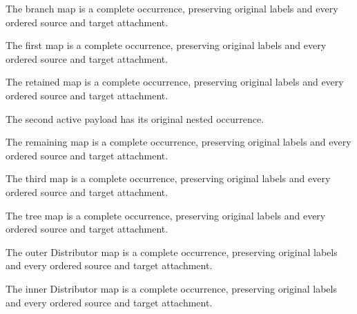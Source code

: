 The branch map is a complete occurrence, preserving original labels and every ordered source and target attachment.
\par{}

The first map is a complete occurrence, preserving original labels and every ordered source and target attachment.
\par{}

The retained map is a complete occurrence, preserving original labels and every ordered source and target attachment.
\par{}

The second active payload has its original nested occurrence.
\par{}

The remaining map is a complete occurrence, preserving original labels and every ordered source and target attachment.
\par{}

The third map is a complete occurrence, preserving original labels and every ordered source and target attachment.
\par{}

The tree map is a complete occurrence, preserving original labels and every ordered source and target attachment.
\par{}

The outer Distributor map is a complete occurrence, preserving original labels and every ordered source and target attachment.
\par{}

The inner Distributor map is a complete occurrence, preserving original labels and every ordered source and target attachment.
\par{}


